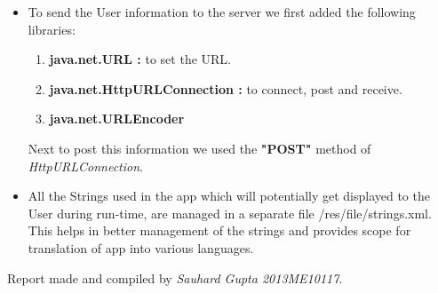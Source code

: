 \documentclass[12pt]{article}
\begin{document}
\begin{itemize}
	
\item  
To send the User information to the server we first added the following libraries:
\begin{enumerate}
    \item \textbf{java.net.URL :} to set the URL. 
    \item \textbf{java.net.HttpURLConnection :} to connect, post and receive.

\item \textbf{java.net.URLEncoder}
\end{enumerate}
Next to post this information we used the \textbf{"POST"} method of \textit{HttpURLConnection}.
\item All the Strings used in the app which will potentially get displayed to the User during run-time, are managed in a separate file /res/file/strings.xml. This helps in better management of the strings and provides scope for translation of app into various languages.



























\end{itemize}

Report made and compiled by {\em Sauhard Gupta 2013ME10117}.
\end{document}
